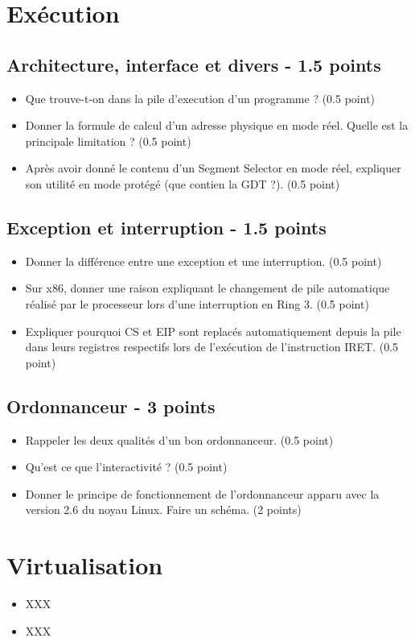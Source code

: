 \section{Ex\'ecution
         {\hfill{} }}

\subsection{Architecture, interface et divers - 1.5 points}
\begin{itemize}
\item Que trouve-t-on dans la pile d'execution d'un programme ? (0.5 point)
\item Donner la formule de calcul d'un adresse physique en mode r\'eel. Quelle est la principale limitation ?  (0.5 point)
\item Apr\`es avoir donn\'e le contenu d'un Segment Selector en mode r\'eel, expliquer son utilit\'e en mode prot\'eg\'e (que contien la GDT ?).  (0.5 point)
\end{itemize}

\subsection{Exception et interruption -  1.5 points}
 \begin{itemize}
\item Donner la diff\'erence entre une exception et une interruption. (0.5 point)
\item Sur x86, donner une raison expliquant le changement de pile automatique r\'ealis\'e par le processeur lors d'une interruption en Ring 3. (0.5 point)
\item Expliquer pourquoi CS et EIP sont replac\'es automatiquement depuis la pile dans leurs registres respectifs lors de l'ex\'ecution de l'instruction IRET. (0.5 point)
\end{itemize}

\subsection{Ordonnanceur - 3 points}
 \begin{itemize}
\item Rappeler les deux qualit\'es d'un bon ordonnanceur. (0.5 point)
\item Qu'est ce que l'interactivit\'e ? (0.5 point)
\item Donner le principe de fonctionnement de l'ordonnanceur apparu avec la version 2.6 du noyau Linux. Faire un sch\'ema. (2 points)
\end{itemize}

%
%

\section{Virtualisation
         }

\begin{itemize}
  \item
    XXX
\end{itemize}

\begin{correction}

\begin{itemize}
  \item
    XXX
\end{itemize}

\end{correction}


